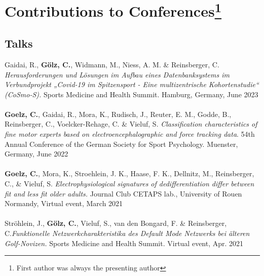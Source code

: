 
\section*{Contributions to Conferences\footnote{First author was always the presenting author}}
\subsection*{Talks}
Gaidai, R., \textbf{Gölz, C.}, Widmann, M., Niess, A. M. \& Reinsberger, C. \textit{Herausforderungen und Lösungen im Aufbau eines Datenbanksystems im Verbundprojekt „Covid-19 im Spitzensport - Eine multizentrische Kohortenstudie“ (CoSmo-S).} Sports Medicine and Health Summit. Hamburg, Germany, June 2023\\
\\
\textbf{Goelz, C.}, Gaidai, R., Mora, K., Rudisch, J., Reuter, E. M., Godde, B., Reinsberger, C., Voelcker-Rehage, C. \& Vieluf, S. \textit{Classification characteristics of fine motor experts based on electroencephalographic and force tracking data}. 54th Annual Conference of the German Society for Sport Psychology. Muenster, Germany, June 2022\\
\\
\textbf{Goelz, C.}, Mora, K., Stroehlein, J. K., Haase, F. K., Dellnitz, M., Reinsberger, C., \& Vieluf, S. \textit{Electrophysiological signatures of dedifferentiation differ between fit and less fit older adults.} Journal Club CETAPS lab., University of Rouen Normandy, Virtual event, March 2021\\
\\
Ströhlein, J., \textbf{Gölz, C.}, Vieluf, S., van den Bongard, F. \& Reinsberger, C.\textit{Funktionelle Netzwerkcharakteristika des Default Mode Netzwerks bei älteren Golf-Novizen.} Sports Medicine and Health Summit. Virtual event, Apr. 2021
